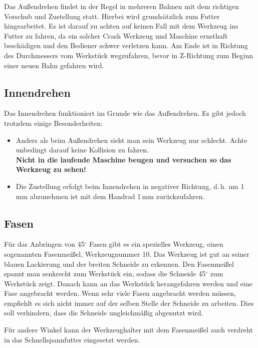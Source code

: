 \documentclass{\basedir/fablab-document}
\begin{document}
Das Außendrehen findet in der Regel in mehreren Bahnen mit dem richtigen Vorschub und Zustellung statt.
Hierbei wird grundsätzlich zum Futter hingearbeitet.
Es ist darauf zu achten auf keinen Fall mit dem Werkzeug ins Futter zu fahren, da ein solcher Crash Werkzeug und Maschine ernsthaft beschädigen und den Bediener schwer verletzen kann.
Am Ende ist in Richtung des Durchmessers vom Werkstück wegzufahren, bevor in Z-Richtung zum Beginn einer neuen Bahn gefahren wird.

\subsection{Innendrehen}

Das Innendrehen funktioniert im Grunde wie das Außendrehen. Es gibt jedoch trotzdem einige Besonderheiten:
\begin{itemize}
\item Anders als beim Außendrehen sieht man sein Werkzeug nur schlecht. Achte unbedingt darauf keine Kollision zu fahren.\\
\textbf{Nicht in die laufende Maschine beugen und versuchen so das Werkzeug zu sehen!}
\item Die Zustellung erfolgt beim Innendrehen in negativer Richtung, d.\,h. um 1\,mm abzunehmen ist mit dem Handrad 1\,mm zurückzufahren.
\end{itemize}

\subsection{Fasen}

Für das Anbringen von 45$^\circ$ Fasen gibt es ein spezielles Werkzeug, einen sogenannten Fasenmeißel, Werkzeugnummer 10.
Das Werkzeug ist gut an seiner blauen Lackierung und der breiten Schneide zu erkennen. 
Den Fasenmeißel spannt man senkrecht zum Werkstück ein, sodass die Schneide 45$^\circ$ zum Werkstück zeigt.
Danach kann an das Werkstück herangefahren werden und eine Fase angebracht werden.
Wenn sehr viele Fasen angebracht werden müssen, empfiehlt es sich nicht immer auf der selben Stelle der Schneide zu arbeiten.
Dies soll verhindern, dass die Schneide ungleichmäßig abgenutzt wird.

Für andere Winkel kann der Werkzeughalter mit dem Fasenmeißel auch verdreht in das Schnellspannfutter eingesetzt werden.
\end{document}
